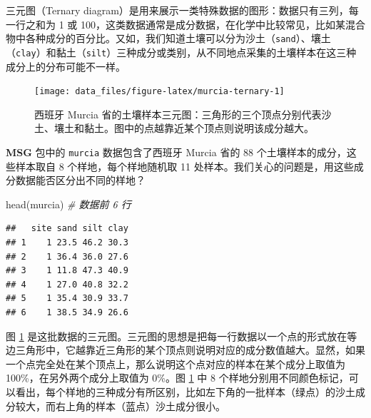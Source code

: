\documentclass[
  b5paper,
  UTF8,twoside]{book}
\newenvironment{Shaded}{\begin{snugshade}}{\end{snugshade}}
\newcommand{\AttributeTok}[1]{\textcolor[rgb]{0.77,0.63,0.00}{#1}}
\newcommand{\CommentTok}[1]{\textcolor[rgb]{0.56,0.35,0.01}{\textit{#1}}}
\newcommand{\DecValTok}[1]{\textcolor[rgb]{0.00,0.00,0.81}{#1}}
\newcommand{\FunctionTok}[1]{\textcolor[rgb]{0.00,0.00,0.00}{#1}}
\newcommand{\NormalTok}[1]{#1}
\newcommand{\SpecialCharTok}[1]{\textcolor[rgb]{0.00,0.00,0.00}{#1}}
\newcommand{\StringTok}[1]{\textcolor[rgb]{0.31,0.60,0.02}{#1}}
\begin{document}
三元图（Ternary diagram）是用来展示一类特殊数据的图形：数据只有三列，每一行之和为 1 或 100，这类数据通常是成分数据，在化学中比较常见，比如某混合物中各种成分的百分比。又如，我们知道土壤可以分为沙土（\texttt{sand}）、壤土（\texttt{clay}）和黏土（\texttt{silt}）三种成分或类别，从不同地点采集的土壤样本在这三种成分上的分布可能不一样。

\begin{Shaded}
\end{Shaded}

\begin{figure}

{\centering \texttt{[image: data\_files/figure-latex/murcia-ternary-1]} 

}

\caption[西班牙 Murcia 省的土壤样本三元图]{西班牙 Murcia 省的土壤样本三元图：三角形的三个顶点分别代表沙土、壤土和黏土。图中的点越靠近某个顶点则说明该成分越大。}\label{fig:murcia-ternary}
\end{figure}



\textbf{MSG} 包中的 \texttt{murcia} 数据包含了西班牙 Murcia 省的 88 个土壤样本的成分，这些样本取自 8 个样地，每个样地随机取 11 处样本。我们关心的问题是，用这些成分数据能否区分出不同的样地？

\begin{Shaded}
\begin{Highlighting}[]
\FunctionTok{head}\NormalTok{(murcia) }\CommentTok{\# 数据前 6 行}
\end{Highlighting}
\end{Shaded}

\begin{verbatim}
##   site sand silt clay
## 1    1 23.5 46.2 30.3
## 2    1 36.4 36.0 27.6
## 3    1 11.8 47.3 40.9
## 4    1 27.0 40.8 32.2
## 5    1 35.4 30.9 33.7
## 6    1 38.5 34.9 26.6
\end{verbatim}

图 \ref{fig:murcia-ternary} 是这批数据的三元图。三元图的思想是把每一行数据以一个点的形式放在等边三角形中，它越靠近三角形的某个顶点则说明对应的成分数值越大。显然，如果一个点完全处在某个顶点上，那么说明这个点对应的样本在某个成分上取值为 100\%，在另外两个成分上取值为 0\%。图 \ref{fig:murcia-ternary} 中 8 个样地分别用不同颜色标记，可以看出，每个样地的三种成分有所区别，比如左下角的一批样本（绿点）的沙土成分较大，而右上角的样本（蓝点）沙土成分很小。
\end{document}
